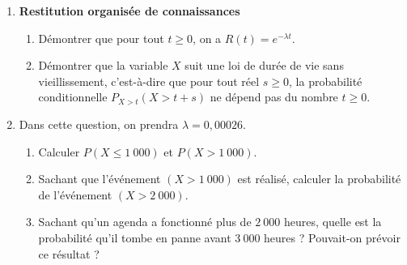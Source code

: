 \begin{enumerate}
     \par
     \item \textbf{Restitution organisée de connaissances}
     \par
     \begin{enumerate}[label=\alph*.]
          \par
          \item Démontrer que pour tout $t \geqslant 0$, on a $R\left(t\right)=e^{-\lambda  t}$.
          \par
          \item Démontrer que la variable  $X$ suit une loi de durée de vie sans vieillissement, c'est-à-dire que pour tout réel $s \geqslant 0$, la probabilité conditionnelle $P_{X > t}\left(X > t+s\right)$ ne dépend pas du nombre $t \geqslant 0$.
          \par
     \end{enumerate}
     \par
     \item Dans cette question, on prendra $\lambda =0,00026$.
     \par
     \begin{enumerate}[label=\alph*.]
          \par
          \item Calculer $P\left(X \leqslant 1~000\right)$ et $P\left(X > 1~000\right)$.
          \par
          \item Sachant que l'événement $\left(X > 1~000\right)$ est réalisé, calculer la probabilité de l'événement $\left(X > 2~000\right)$.
          \par
          \item Sachant qu'un agenda a fonctionné plus de $2~000$ heures, quelle est la probabilité qu'il tombe en panne avant $3~000$ heures ? Pouvait-on prévoir ce résultat ?
          \par
     \end{enumerate}
     \par
\end{enumerate}
\par
